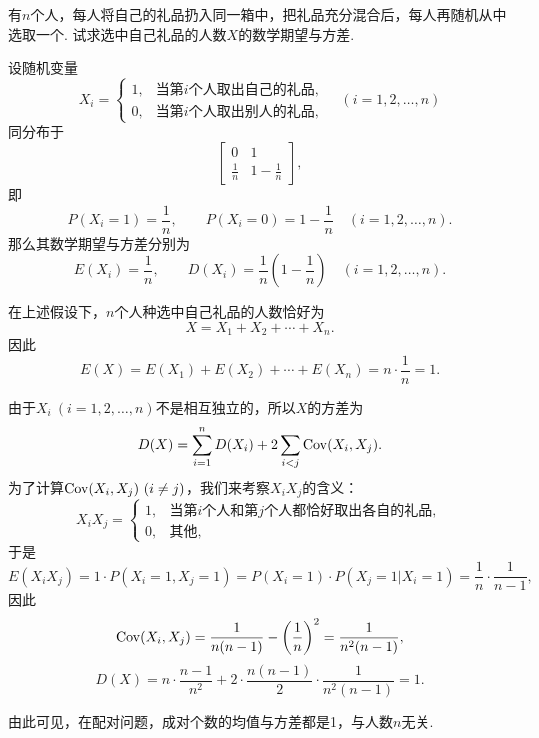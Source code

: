 \begin{example}[配对问题]
有\(n\)个人，每人将自己的礼品扔入同一箱中，把礼品充分混合后，每人再随机从中选取一个.
试求选中自己礼品的人数\(X\)的数学期望与方差.
\begin{solution}
设随机变量\[
    X_i = \left\{ \begin{array}{ll}
    1, & \text{当第\(i\)个人取出自己的礼品}, \\
    0, & \text{当第\(i\)个人取出别人的礼品},
    \end{array} \right.
    \quad(i=1,2,\dotsc,n)
\]同分布于\[
    \begin{bmatrix}
    0 & 1 \\
    \frac{1}{n} & 1-\frac{1}{n}
    \end{bmatrix},
\]
即\[
    P(X_i=1) = \frac{1}{n}, \qquad
    P(X_i=0) = 1-\frac{1}{n}
    \quad(i=1,2,\dotsc,n).
\]
那么其数学期望与方差分别为\[
    E(X_i) = \frac{1}{n},
    \qquad
    D(X_i) = \frac{1}{n}\left(1-\frac{1}{n}\right)
    \quad(i=1,2,\dotsc,n).
\]

在上述假设下，\(n\)个人种选中自己礼品的人数恰好为\[
    X = X_1+X_2+\dotsb+X_n.
\]因此\[
    E(X) = E(X_1)+E(X_2)+\dotsb+E(X_n)
    = n \cdot \frac{1}{n}
    = 1.
\]

由于\(X_i\ (i=1,2,\dotsc,n)\)不是相互独立的，所以\(X\)的方差为\[
    D(X) = \sum_{i=1}^n D(X_i) + 2 \sum_{i<j} \operatorname{Cov}(X_i,X_j).
\]
为了计算\(\operatorname{Cov}(X_i,X_j)\ (i \neq j)\)，我们来考察\(X_i X_j\)的含义：\[
    X_i X_j = \left\{ \begin{array}{ll}
    1, & \text{当第\(i\)个人和第\(j\)个人都恰好取出各自的礼品}, \\
    0, & \text{其他},
    \end{array} \right.
\]于是\[
    E(X_i X_j) = 1 \cdot P(X_i=1,X_j=1)
    = P(X_i=1) \cdot P(X_j=1 \vert X_i=1)
    = \frac{1}{n} \cdot \frac{1}{n-1},
\]
因此\[
    \operatorname{Cov}(X_i,X_j) = \frac{1}{n(n-1)} - \left(\frac{1}{n}\right)^2
    = \frac{1}{n^2(n-1)},
\]\[
    D(X) = n \cdot \frac{n-1}{n^2} + 2 \cdot \frac{n(n-1)}{2} \cdot \frac{1}{n^2(n-1)}
    = 1.
\]
\end{solution}
由此可见，在配对问题，成对个数的均值与方差都是1，与人数\(n\)无关.
\end{example}


